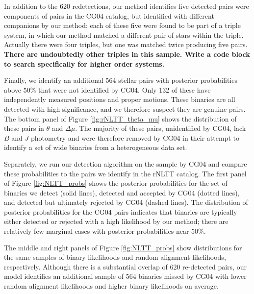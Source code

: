 \documentclass[usenatbib]{mnras}
\begin{document}
In addition to the 620 redetections, our method identifies five detected pairs were components of pairs in the CG04 catalog, but identified with different companions by our method; each of these five were found to be part of a triple system, in which our method matched a different pair of stars within the triple. Actually there were four triples, but one was matched twice producing five pairs. {\bf There are undoubtedly other triples in this sample. Write a code block to search specifically for higher order systems.}


Finally, we identify an additional 564 stellar pairs with posterior probabilities above 50\% that were not identified by CG04. Only 132 of these have independently measured positions and proper motions. These binaries are all detected with high significance, and we therefore suspect they are genuine pairs. The bottom panel of Figure \ref{fig:rNLTT_theta_mu} shows the distribution of these pairs in $\theta$ and $\Delta \mu$. The majority of these pairs, unidentified by CG04, lack $B$ and $J$ photometry and were therefore removed by CG04 in their attempt to identify a set of wide binaries from a heterogeneous data set.





Separately, we run our detection algorithm on the sample by CG04 and compare these probabilities to the pairs we identify in the rNLTT catalog. The first panel of Figure \ref{fig:NLTT_probs} shows the posterior probabilities for the set of binaries we detect (solid lines), detected and accepted by CG04 (dotted lines), and detected but ultimately rejected by CG04 (dashed lines). The distribution of posterior probabilities for the CG04 pairs indicates that binaries are typically either detected or rejected with a high likelihood by our method; there are relatively few marginal cases with posterior probabilities near 50\%.


The middle and right panels of Figure \ref{fig:NLTT_probs} show distributions for the same samples of binary likelihoods and random alignment likelihoods, respectively. Although there is a substantial overlap of 620 re-detected pairs, our model identifies an additional sample of 564 binaries missed by CG04 with lower random alignment likelihoods and higher binary likelihoods on average. 
\end{document}
